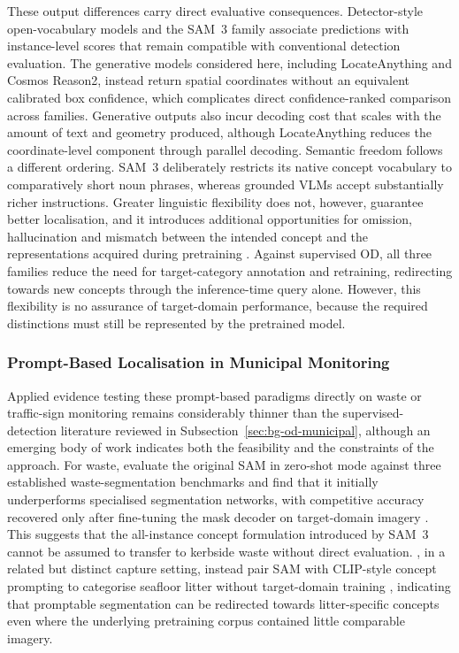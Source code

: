 \noindent These output differences carry direct evaluative consequences. Detector-style open-vocabulary models and the \gls{SAM}~3 family associate predictions with instance-level scores that remain compatible with conventional detection evaluation. The generative models considered here, including LocateAnything and Cosmos Reason2, instead return spatial coordinates without an equivalent calibrated box confidence, which complicates direct confidence-ranked comparison across families. Generative outputs also incur decoding cost that scales with the amount of text and geometry produced, although LocateAnything reduces the coordinate-level component through parallel decoding. Semantic freedom follows a different ordering. \gls{SAM}~3 deliberately restricts its native concept vocabulary to comparatively short noun phrases, whereas grounded \glspl{VLM} accept substantially richer instructions. Greater linguistic flexibility does not, however, guarantee better localisation, and it introduces additional opportunities for omission, hallucination and mismatch between the intended concept and the representations acquired during pretraining \cite{meta2025sam3,bulzan2026unlocking,guan2024hallusionbench}. Against supervised \gls{OD}, all three families reduce the need for target-category annotation and retraining, redirecting towards new concepts through the inference-time query alone. However, this flexibility is no assurance of target-domain performance, because the required distinctions must still be represented by the pretrained model.

\subsubsection{Prompt-Based Localisation in Municipal Monitoring}
\label{sec:bg-zs-applications}
Applied evidence testing these prompt-based paradigms directly on waste or traffic-sign monitoring remains considerably thinner than the supervised-detection literature reviewed in Subsection~\ref{sec:bg-od-municipal}, although an emerging body of work indicates both the feasibility and the constraints of the approach. For waste, \citeauthor{baker2026dontwastesam} evaluate the original \gls{SAM} in zero-shot mode against three established waste-segmentation benchmarks and find that it initially underperforms specialised segmentation networks, with competitive accuracy recovered only after fine-tuning the mask decoder on target-domain imagery \cite{baker2026dontwastesam}. This suggests that the all-instance concept formulation introduced by \gls{SAM}~3 cannot be assumed to transfer to kerbside waste without direct evaluation. \citeauthor{nguyen2024marinelitterzeroshot}, in a related but distinct capture setting, instead pair \gls{SAM} with \gls{CLIP}-style concept prompting to categorise seafloor litter without target-domain training \cite{nguyen2024marinelitterzeroshot}, indicating that promptable segmentation can be redirected towards litter-specific concepts even where the underlying pretraining corpus contained little comparable imagery.

